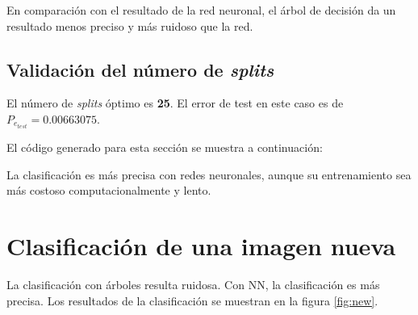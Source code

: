 \documentclass[11pt]{article} %
\begin{document}
\newpage

En comparación con el resultado de la red neuronal, el árbol de decisión da un resultado menos preciso y más ruidoso que la red.

\subsection{Validación del número de \emph{splits}}

El número de \emph{splits} óptimo es \textbf{25}. El error de test en este caso es de $P_{e_{test}} = 0.00663075$.

El código generado para esta sección se muestra a continuación:



La clasificación es más precisa con redes neuronales, aunque su entrenamiento sea más costoso computacionalmente y lento.	

\section{Clasificación de una imagen nueva}

La clasificación con árboles resulta ruidosa. Con NN, la clasificación es más precisa. Los resultados de la clasificación se muestran en la figura \ref{fig:new}.
\end{document}

